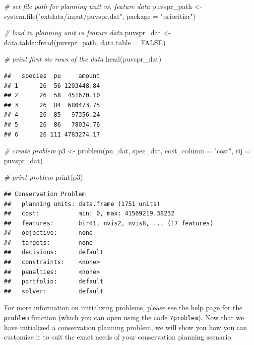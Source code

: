 \documentclass[
  12pt,
]{book}
\newenvironment{Shaded}{\begin{snugshade}}{\end{snugshade}}
\newcommand{\AttributeTok}[1]{\textcolor[rgb]{0.77,0.63,0.00}{#1}}
\newcommand{\CommentTok}[1]{\textcolor[rgb]{0.56,0.35,0.01}{\textit{#1}}}
\newcommand{\ConstantTok}[1]{\textcolor[rgb]{0.00,0.00,0.00}{#1}}
\newcommand{\FunctionTok}[1]{\textcolor[rgb]{0.00,0.00,0.00}{#1}}
\newcommand{\NormalTok}[1]{#1}
\newcommand{\OtherTok}[1]{\textcolor[rgb]{0.56,0.35,0.01}{#1}}
\newcommand{\SpecialCharTok}[1]{\textcolor[rgb]{0.00,0.00,0.00}{#1}}
\newcommand{\StringTok}[1]{\textcolor[rgb]{0.31,0.60,0.02}{#1}}
\begin{document}
\begin{Shaded}
\begin{Highlighting}[]
\CommentTok{\# set file path for planning unit vs. feature data}
\NormalTok{puvspr\_path }\OtherTok{\textless{}{-}} \FunctionTok{system.file}\NormalTok{(}\StringTok{"extdata/input/puvspr.dat"}\NormalTok{, }\AttributeTok{package =} \StringTok{"prioritizr"}\NormalTok{)}

\CommentTok{\# load in planning unit vs feature data}
\NormalTok{puvspr\_dat }\OtherTok{\textless{}{-}}\NormalTok{ data.table}\SpecialCharTok{::}\FunctionTok{fread}\NormalTok{(puvspr\_path, }\AttributeTok{data.table =} \ConstantTok{FALSE}\NormalTok{)}

\CommentTok{\# print first six rows of the data}
\FunctionTok{head}\NormalTok{(puvspr\_dat)}
\end{Highlighting}
\end{Shaded}

\begin{verbatim}
##   species  pu     amount
## 1      26  56 1203448.84
## 2      26  58  451670.10
## 3      26  84  680473.75
## 4      26  85   97356.24
## 5      26  86   78034.76
## 6      26 111 4783274.17
\end{verbatim}

\begin{Shaded}
\begin{Highlighting}[]
\CommentTok{\# create problem}
\NormalTok{p3 }\OtherTok{\textless{}{-}} \FunctionTok{problem}\NormalTok{(pu\_dat, spec\_dat, }\AttributeTok{cost\_column =} \StringTok{"cost"}\NormalTok{, }\AttributeTok{rij =}\NormalTok{ puvspr\_dat)}

\CommentTok{\# print problem}
\FunctionTok{print}\NormalTok{(p3)}
\end{Highlighting}
\end{Shaded}

\begin{verbatim}
## Conservation Problem
##   planning units: data.frame (1751 units)
##   cost:           min: 0, max: 41569219.38232
##   features:       bird1, nvis2, nvis8, ... (17 features)
##   objective:      none
##   targets:        none
##   decisions:      default
##   constraints:    <none>
##   penalties:      <none>
##   portfolio:      default
##   solver:         default
\end{verbatim}

For more information on initializing problems, please see the help page for the \texttt{problem} function (which you can open using the code \texttt{?problem}). Now that we have initialized a conservation planning problem, we will show you how you can customize it to suit the exact needs of your conservation planning scenario.
\end{document}
